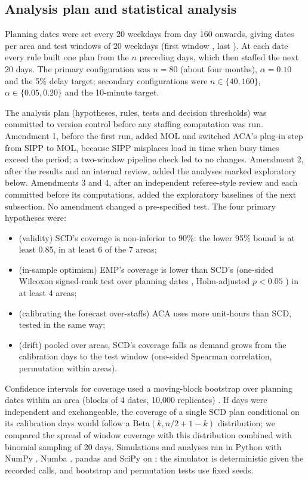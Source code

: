 \documentclass[11pt]{article}
\begin{document}
\subsection{Analysis plan and statistical analysis}

Planning dates were set every 20 weekdays from day 160 onwards, giving  dates per area and  test windows of 20 weekdays (first window , last ). At each date every rule built one plan from the $n$ preceding days, which then staffed the next 20 days. The primary configuration was $n=80$ (about four months), $\alpha=0.10$ and the 5\% delay target; secondary configurations were $n\in\{40,160\}$, $\alpha\in\{0.05,0.20\}$ and the 10-minute target.

The analysis plan (hypotheses, rules, tests and decision thresholds) was committed to version control before any staffing computation was run. Amendment 1, before the first run, added MOL and switched ACA's plug-in step from SIPP to MOL, because SIPP misplaces load in time when busy times exceed the period; a two-window pipeline check led to no changes. Amendment 2, after the results and an internal review, added the analyses marked exploratory below. Amendments 3 and 4, after an independent referee-style review and each committed before its computations, added the exploratory baselines of the next subsection. No amendment changed a pre-specified test. The four primary hypotheses were:
\begin{itemize}
\item[H1] (validity) SCD's coverage is non-inferior to 90\%: the lower 95\% bound is at least 0.85, in at least 6 of the 7 areas;
\item[H2] (in-sample optimism) EMP's coverage is lower than SCD's (one-sided Wilcoxon signed-rank test over planning dates \citep{wilcoxon1945individual}, Holm-adjusted $p<0.05$ \citep{holm1979simple}) in at least 4 areas;
\item[H3] (calibrating the forecast over-staffs) ACA uses more unit-hours than SCD, tested in the same way;
\item[H4] (drift) pooled over areas, SCD's coverage falls as demand grows from the calibration days to the test window (one-sided Spearman correlation, permutation within areas).
\end{itemize}
Confidence intervals for coverage used a moving-block bootstrap over planning dates within an area (blocks of 4 dates, 10{,}000 replicates) \citep{kunsch1989jackknife}. If days were independent and exchangeable, the coverage of a single SCD plan conditional on its calibration days would follow a Beta$(k, n/2+1-k)$ distribution; we compared the spread of window coverage with this distribution combined with binomial sampling of 20 days. Simulations and analyses ran in Python  with NumPy , Numba , pandas  and SciPy  on ; the simulator is deterministic given the recorded calls, and bootstrap and permutation tests use fixed seeds.
\end{document}
